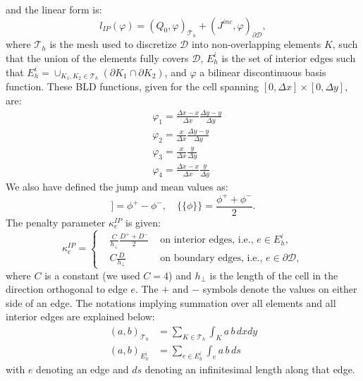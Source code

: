 \documentclass{mc2013}
\newcommand{\jmp}[1]{[\![#1]\!]}                     %
\newcommand{\mvl}[1]{\{\!\!\{#1\}\!\!\}}             %
\newcommand\tf{\varphi}
\newcommand\mc{\mathcal}
\renewcommand{\(}{\left(}
\renewcommand{\)}{\right)}
\renewcommand{\[}{\left[}
\renewcommand{\]}{\right]}
\begin{document}
and the linear form is:
\begin{equation}
\label{eq:rhs-ip-form}
  l_{IP}(\tf) = \(Q_0,\tf\)_{\mc{T}_h} + (J^{inc},\tf)_{\partial \mc{D}},
\end{equation}
%
%
where $\mc{T}_h$ is the mesh used to discretize $\mc{D}$ into non-overlapping 
elements $K$, such that the union of the elements fully covers $\mc{D}$, $E_h^i$ is 
the set of interior edges such that $E_h^i= \cup _{K_1,K_2\in \mc{T}_h}(\partial K_1 \cap \partial K_2)$,
and $\tf$ a bilinear discontinuous basis function. These BLD functions, given for the cell spanning 
$[0,{\Delta x}]\times[0, \Delta y]$, are:
\begin{align*}
& \tf_1 = \frac{{\Delta x}-x}{{\Delta x}}\frac{\Delta y-y}{\Delta y}\\
& \tf_2 = \frac{x}{{\Delta x}} \frac{\Delta y-y}{\Delta y}\\
& \tf_3 = \frac{x}{{\Delta x}}\frac{y}{\Delta y}\\
& \tf_4 = \frac{{\Delta x}-x}{{\Delta x}}\frac{y}{\Delta y}
\end{align*}
We also have defined the jump and mean values as:
\begin{equation}
  \jmp{\phi} = \phi^+ - \phi^-,\quad
  \mvl{\phi} =  \frac{\phi^++\phi^-}{2}.
\end{equation}
The penalty parameter $\kappa_e^{IP}$ is given:
\begin{equation}
\label{eq:penalty-ip}
  \kappa_e^{IP} = \left\{
    \begin{aligned}
      & \frac{C}{h_{\bot}} \frac{D^+ +D^-}{2} & \textrm{ on interior edges, i.e., } e \in  E_h^i,\\
      & C\frac{D}{h_{\bot}} & \textrm{ on boundary edges, i.e., } e \in \partial \mc{D},
    \end{aligned}
    \right.
\end{equation}
where $C$ is a constant (we used $C=4$) and $h_{\bot}$ is the
length of the cell in the direction orthogonal to edge $e$.  The $+$ and $-$
symbols denote the values on either side of an edge. 
The notations implying summation over all elements and all interior edges are explained below: 
\begin{align*}
\(a,b\)_{\mc{T}_h} &= \sum_{K \in \mc{T}_h } \int_K a\,b\,dxdy \\
\(a,b\)_{E_h^i}    &= \sum_{e \in E_h^i } \int_e a\,b \,ds
\end{align*}
with $e$ denoting an edge and $ds$ denoting an infinitesimal length along that edge.\\
\end{document}
